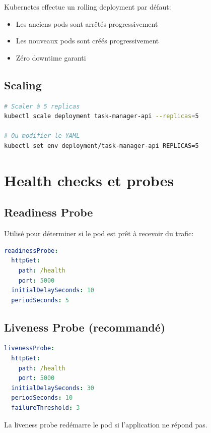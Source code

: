 \documentclass[12pt,a4paper,twoside]{report}
\begin{document}
Kubernetes effectue un rolling deployment par défaut:
\begin{itemize}
    \item Les anciens pods sont arrêtés progressivement
    \item Les nouveaux pods sont créés progressivement
    \item Zéro downtime garanti
\end{itemize}

\subsection{Scaling}

\begin{lstlisting}[language=bash]
# Scaler à 5 replicas
kubectl scale deployment task-manager-api --replicas=5

# Ou modifier le YAML
kubectl set env deployment/task-manager-api REPLICAS=5
\end{lstlisting}

\section{Health checks et probes}

\subsection{Readiness Probe}

Utilisé pour déterminer si le pod est prêt à recevoir du trafic:

\begin{lstlisting}[language=yaml]
readinessProbe:
  httpGet:
    path: /health
    port: 5000
  initialDelaySeconds: 10
  periodSeconds: 5
\end{lstlisting}

\subsection{Liveness Probe (recommandé)}

\begin{lstlisting}[language=yaml]
livenessProbe:
  httpGet:
    path: /health
    port: 5000
  initialDelaySeconds: 30
  periodSeconds: 10
  failureThreshold: 3
\end{lstlisting}

La liveness probe redémarre le pod si l'application ne répond pas.

\newpage
\end{document}
